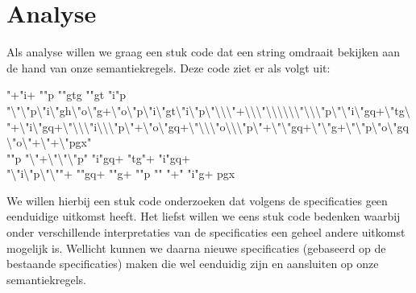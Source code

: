 \section{Analyse}
\label{sec:analyse}
Als analyse willen we graag een stuk code dat een string omdraait bekijken aan
de hand van onze semantiekregels. Deze code ziet er als volgt uit:
\begin{smurf}
	\footnotesize
	"+"i+ ""p ""gtg ""gt "i"p\\
	"\textbackslash{}"\textbackslash{}"p\textbackslash{}"i\textbackslash{}"gh\textbackslash{}"o\textbackslash{}"g+\textbackslash{}"o\textbackslash{}"p\textbackslash{}"i\textbackslash{}"gt\textbackslash{}"i\textbackslash{}"p\textbackslash{}"\textbackslash{}\textbackslash{}\textbackslash{}"+\textbackslash{}\textbackslash{}\textbackslash{}"\textbackslash{}\textbackslash{}\textbackslash{}\textbackslash{}\textbackslash{}\textbackslash{}"\textbackslash{}\textbackslash{}\textbackslash{}"p\textbackslash{}"\textbackslash{}"i\textbackslash{}"gq+\textbackslash{}"tg\textbackslash{}"+\textbackslash{}"i\textbackslash{}"gq+\textbackslash{}"\textbackslash{}\textbackslash{}\textbackslash{}"i\textbackslash{}\textbackslash{}\textbackslash{}"p\textbackslash{}"+\textbackslash{}"o\textbackslash{}"gq+\textbackslash{}"\textbackslash{}\textbackslash{}\textbackslash{}"o\textbackslash{}\textbackslash{}\textbackslash{}"p\textbackslash{}"+\textbackslash{}"\textbackslash{}"gq+\textbackslash{}"\textbackslash{}"g+\textbackslash{}"\textbackslash{}"p\textbackslash{}"o\textbackslash{}"gq\textbackslash{}"o\textbackslash{}"+\textbackslash{}"+\textbackslash{}"pgx"\\
	""p "\textbackslash{}"+\textbackslash{}"\textbackslash{}"\textbackslash{}"p" "i"gq+ "tg"+ "i"gq+\\
	"\textbackslash{}"i\textbackslash{}"p\textbackslash{}"\textbackslash{}""+ ""gq+ ""g+ ""p "" "+" "i"g+ pgx
\end{smurf}
	
We willen hierbij een stuk code onderzoeken dat volgens de specificaties geen
eenduidige uitkomst heeft. Het liefst willen we eens stuk code bedenken waarbij
onder verschillende interpretaties van de specificaties een geheel andere
uitkomst mogelijk is. Wellicht kunnen we daarna nieuwe specificaties (gebaseerd
op de bestaande specificaties) maken die wel eenduidig zijn en aansluiten op
onze semantiekregels.
